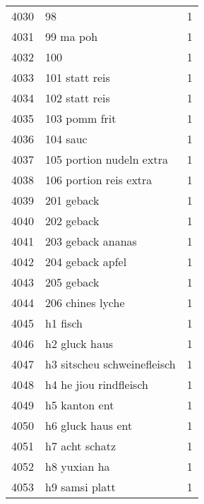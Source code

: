 \begin{tabular}{llr}
4030 &                                                 98 &      1 \\
4031 &                                          99 ma poh &      1 \\
4032 &                                                100 &      1 \\
4033 &                                     101 statt reis &      1 \\
4034 &                                     102 statt reis &      1 \\
4035 &                                      103 pomm frit &      1 \\
4036 &                                           104 sauc &      1 \\
4037 &                           105 portion nudeln extra &      1 \\
4038 &                             106 portion reis extra &      1 \\
4039 &                                         201 geback &      1 \\
4040 &                                         202 geback &      1 \\
4041 &                                  203 geback ananas &      1 \\
4042 &                                   204 geback apfel &      1 \\
4043 &                                         205 geback &      1 \\
4044 &                                   206 chines lyche &      1 \\
4045 &                                           h1 fisch &      1 \\
4046 &                                      h2 gluck haus &      1 \\
4047 &                        h3 sitscheu schweinefleisch &      1 \\
4048 &                             h4 he jiou rindfleisch &      1 \\
4049 &                                      h5 kanton ent &      1 \\
4050 &                                  h6 gluck haus ent &      1 \\
4051 &                                     h7 acht schatz &      1 \\
4052 &                                       h8 yuxian ha &      1 \\
4053 &                                     h9 samsi platt &      1 \\

\end{tabular}
